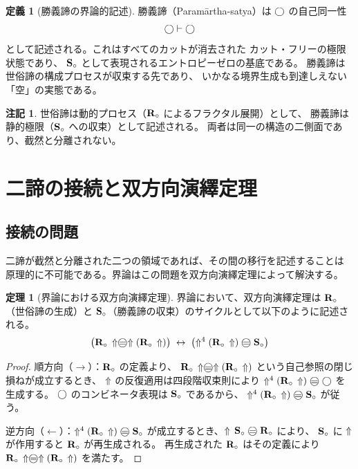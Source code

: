 \documentclass[11pt,a4paper]{ltjsarticle}
\theoremstyle{definition}
\newtheorem{definition}{定義}[section]
\newtheorem{theorem}{定理}[section]
\newtheorem{remark}{注記}[section]
\begin{document}
\begin{definition}[勝義諦の界論的記述]
勝義諦（Paramārtha-satya）は $\bigcirc$ の自己同一性
\[
\bigcirc \vdash \bigcirc
\]
として記述される。これはすべてのカットが消去された
カット・フリーの極限状態であり、
$\mathbf{S}_{\circ}$ として表現されるエントロピーゼロの基底である。
勝義諦は世俗諦の構成プロセスが収束する先であり、
いかなる境界生成も到達しえない「空」の実態である。
\end{definition}

\begin{remark}
世俗諦は動的プロセス（$\mathbf{R}_{\circ}$ によるフラクタル展開）として、
勝義諦は静的極限（$\mathbf{S}_{\circ}$ への収束）として記述される。
両者は同一の構造の二側面であり、截然と分離されない。
\end{remark}

\section{二諦の接続と双方向演繹定理}

\subsection{接続の問題}

二諦が截然と分離された二つの領域であれば、その間の移行を記述することは
原理的に不可能である。界論はこの問題を双方向演繹定理によって解決する。

\begin{theorem}[界論における双方向演繹定理]
界論において、双方向演繹定理は $\mathbf{R}_{\circ}$（世俗諦の生成）と
$\mathbf{S}_{\circ}$（勝義諦の収束）のサイクルとして以下のように記述される。
\[
\bigl(\Rmw\,\metanegation \mweq \metanegation(\Rmw\,\metanegation)\bigr)
\;\leftrightarrow\;
\bigl(\metanegation^4(\Rmw\,\metanegation) \mweq \Svoid\bigr)
\]
\end{theorem}

\begin{proof}
順方向（$\to$）：$\mathbf{R}_{\circ}$ の定義より、
$\Rmw\,\metanegation \mweq \metanegation(\Rmw\,\metanegation)$
という自己参照の閉じ損ねが成立するとき、
$\Uparrow$ の反復適用は四段階収束則により
$\metanegation^4(\Rmw\,\metanegation) \mweq \dfix$ を生成する。
$\bigcirc$ のコンビネータ表現は $\mathbf{S}_{\circ}$ であるから、
$\metanegation^4(\Rmw\,\metanegation) \mweq \Svoid$ が従う。

逆方向（$\leftarrow$）：$\metanegation^4(\Rmw\,\metanegation) \mweq \Svoid$
が成立するとき、$\metanegation\,\Svoid \mweq \Rmw$ により、
$\mathbf{S}_{\circ}$ に $\Uparrow$ が作用すると $\mathbf{R}_{\circ}$ が再生成される。
再生成された $\mathbf{R}_{\circ}$ はその定義により
$\Rmw\,\metanegation \mweq \metanegation(\Rmw\,\metanegation)$
を満たす。
\end{proof}
\end{document}
